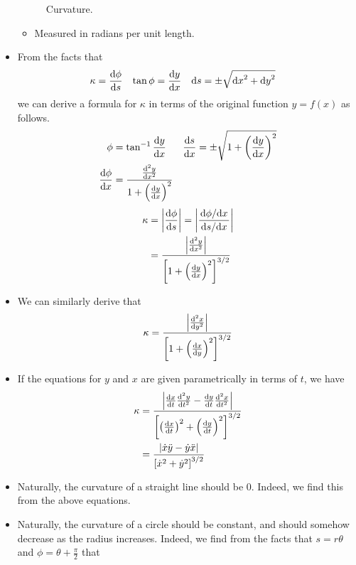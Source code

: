 \documentclass[../main.tex]{subfiles}
\begin{document}
\begin{itemize}
\begin{figure}[h!]
        \caption{Curvature.}
        \label{fig:curvature}
    \end{figure}
    \begin{itemize}
        \item Measured in radians per unit length.
    \end{itemize}
    \item From the facts that
    \begin{align*}
        \kappa &= \dv{\phi}{s}&
            \tan\phi &= \dv{y}{x}&
                \dd{s} &= \pm\sqrt{\dd{x}^2+\dd{y}^2}
    \end{align*}
    we can derive a formula for $\kappa$ in terms of the original function $y=f(x)$ as follows.
    \begin{align*}
        \phi &= \tan^{-1}\dv{y}{x}&
            \dv{s}{x} &= \pm\sqrt{1+\left( \dv{y}{x} \right)^2}\\
        \dv{\phi}{x} &= \frac{\dv[2]{y}{x}}{1+\left( \dv{y}{x} \right)^2}
    \end{align*}
    \begin{align*}
        \kappa &= \left| \dv{\phi}{s} \right|
        = \left| \frac{\dv*{\phi}{x}}{\dv*{s}{x}} \right|\\
        &= \frac{\left| \dv[2]{y}{x} \right|}{\left[ 1+\left( \dv{y}{x} \right)^2 \right]^{3/2}}
    \end{align*}
    \item We can similarly derive that
    \begin{equation*}
        \kappa = \frac{\left| \dv[2]{x}{y} \right|}{\left[ 1+\left( \dv{x}{y} \right)^2 \right]^{3/2}}
    \end{equation*}
    \item If the equations for $y$ and $x$ are given parametrically in terms of $t$, we have
    \begin{align*}
        \kappa &= \frac{\left| \dv{x}{t}\dv[2]{y}{t}-\dv{y}{t}\dv[2]{x}{t} \right|}{\left[ \left( \dv{x}{t} \right)^2+\left( \dv{y}{t} \right)^2 \right]^{3/2}}\\
        &= \frac{|\dot{x}\ddot{y}-\dot{y}\ddot{x}|}{\left[ \dot{x}^2+\dot{y}^2 \right]^{3/2}}
    \end{align*}
    \item Naturally, the curvature of a straight line should be 0. Indeed, we find this from the above equations.
    \item Naturally, the curvature of a circle should be constant, and should somehow decrease as the radius increases. Indeed, we find from the facts that $s=r\theta$ and $\phi=\theta+\frac{\pi}{2}$ that

\end{itemize}
\end{document}
